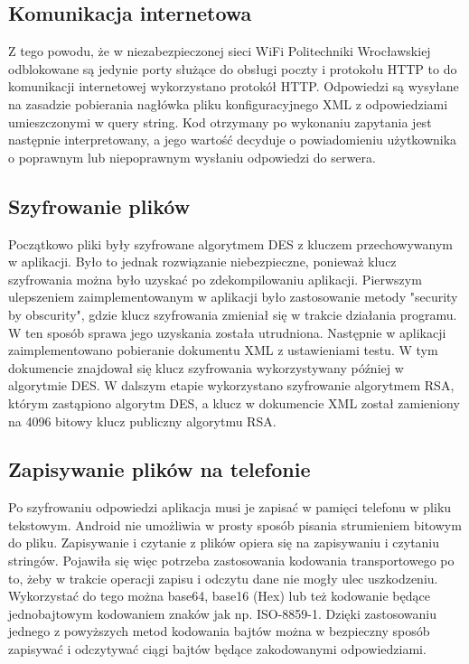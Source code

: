 \documentclass{report}
\begin{document}
			\subsection{Komunikacja internetowa}
			
			Z tego powodu, że w niezabezpieczonej sieci WiFi Politechniki Wrocławskiej odblokowane są jedynie porty służące do obsługi poczty i protokołu HTTP to do komunikacji internetowej wykorzystano protokół HTTP. Odpowiedzi są wysyłane na zasadzie pobierania nagłówka pliku konfiguracyjnego XML z odpowiedziami umieszczonymi w query string. Kod otrzymany po wykonaniu zapytania jest następnie interpretowany, a jego wartość decyduje o powiadomieniu użytkownika o poprawnym lub niepoprawnym wysłaniu odpowiedzi do serwera.
		
			\subsection{Szyfrowanie plików}
		
			Początkowo pliki były szyfrowane algorytmem DES z kluczem przechowywanym w aplikacji. Było to jednak rozwiązanie niebezpieczne, ponieważ klucz szyfrowania można było uzyskać po zdekompilowaniu aplikacji. Pierwszym ulepszeniem zaimplementowanym w aplikacji było zastosowanie metody "security by obscurity", gdzie klucz szyfrowania zmieniał się w trakcie działania programu. W ten sposób sprawa jego uzyskania została utrudniona. Następnie w aplikacji zaimplementowano pobieranie dokumentu XML z ustawieniami testu. W tym dokumencie znajdował się klucz szyfrowania wykorzystywany później w algorytmie DES. W dalszym etapie wykorzystano szyfrowanie algorytmem RSA, którym zastąpiono algorytm DES, a klucz w dokumencie XML został zamieniony na 4096 bitowy klucz publiczny algorytmu RSA.
			
			\subsection{Zapisywanie plików na telefonie}
			
			Po szyfrowaniu odpowiedzi aplikacja musi je zapisać w pamięci telefonu w pliku tekstowym. Android nie umożliwia w prosty sposób pisania strumieniem bitowym do pliku. Zapisywanie i czytanie z plików opiera się na zapisywaniu i czytaniu stringów. Pojawiła się więc potrzeba zastosowania kodowania transportowego po to, żeby w trakcie operacji zapisu i odczytu dane nie mogły ulec uszkodzeniu. Wykorzystać do tego można base64, base16 (Hex) lub też kodowanie będące jednobajtowym kodowaniem znaków jak np. ISO-8859-1. Dzięki zastosowaniu jednego z powyższych metod kodowania bajtów można w bezpieczny sposób zapisywać i odczytywać ciągi bajtów będące zakodowanymi odpowiedziami.
		
\end{document}
